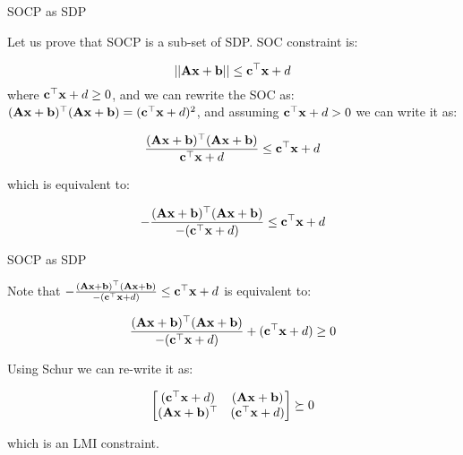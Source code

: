 \documentclass{beamer}
\begin{document}
\begin{frame}{SOCP as SDP}
	\begin{flushleft}
		
		Let us prove that SOCP is a sub-set of SDP. SOC constraint is:
		
		\begin{equation}
			||\mathbf{A}\mathbf{x} + \mathbf{b}|| \leq \mathbf{c}^\top \mathbf{x} + d
		\end{equation}
		where $\mathbf{c}^\top \mathbf{x} + d \geq 0$, and we can rewrite the SOC as: $(\mathbf{A}\mathbf{x} + \mathbf{b})^\top (\mathbf{A}\mathbf{x} + \mathbf{b}) = (\mathbf{c}^\top \mathbf{x} + d)^2$, and assuming $\mathbf{c}^\top \mathbf{x} + d > 0$ we can write it as:
		
		\begin{equation}
			\frac{(\mathbf{A}\mathbf{x} + \mathbf{b})^\top (\mathbf{A}\mathbf{x} + \mathbf{b})}{\mathbf{c}^\top \mathbf{x} + d} \leq \mathbf{c}^\top \mathbf{x} + d
		\end{equation}
		
		which is equivalent to:
		
		\begin{equation}
			-\frac{(\mathbf{A}\mathbf{x} + \mathbf{b})^\top (\mathbf{A}\mathbf{x} + \mathbf{b})}{-(\mathbf{c}^\top \mathbf{x} + d)} \leq \mathbf{c}^\top \mathbf{x} + d
		\end{equation}
		
	\end{flushleft}
\end{frame}





\begin{frame}{SOCP as SDP}
	\begin{flushleft}
		
		Note that $-\frac{(\mathbf{A}\mathbf{x} + \mathbf{b})^\top (\mathbf{A}\mathbf{x} + \mathbf{b})}{-(\mathbf{c}^\top \mathbf{x} + d)} \leq \mathbf{c}^\top \mathbf{x} + d$ is equivalent to:
		
		\begin{equation}
			\frac{(\mathbf{A}\mathbf{x} + \mathbf{b})^\top (\mathbf{A}\mathbf{x} + \mathbf{b})}{-(\mathbf{c}^\top \mathbf{x} + d)} + (\mathbf{c}^\top \mathbf{x} + d) \geq 0
		\end{equation}
		
		Using Schur we can re-write it as:
		
		\begin{equation}
			\begin{bmatrix}
				(\mathbf{c}^\top \mathbf{x} + d) & (\mathbf{A}\mathbf{x} + \mathbf{b}) \\
				(\mathbf{A}\mathbf{x} + \mathbf{b})^\top & (\mathbf{c}^\top \mathbf{x} + d)
			\end{bmatrix} \succeq 0
		\end{equation}
		
		which is an LMI constraint.
		
	\end{flushleft}
\end{frame}
\end{document}
